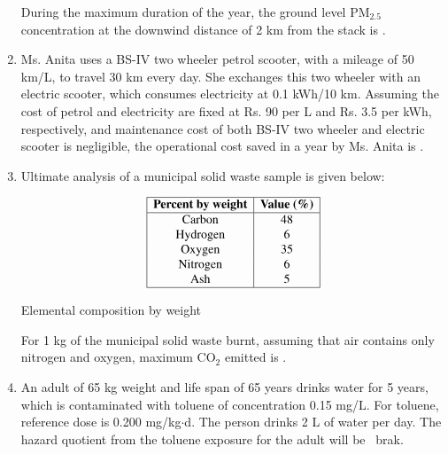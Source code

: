 \documentclass[journal,12pt,onecolumn]{IEEEtran}
\theoremstyle{remark}
\begin{document}
\begin{enumerate}
During the maximum duration of the year, the ground level PM$_{2.5}$ concentration at the downwind distance of 2 km  from the stack is \underline{\hspace{2cm}} .  
\hfill{}

\newpage

\item Ms. Anita uses a BS-IV two wheeler petrol scooter, with a mileage of 50 km/L, to travel 30 km every day. She exchanges this two wheeler with an electric scooter, which consumes electricity at 0.1 kWh/10 km. Assuming the cost of petrol and electricity are fixed at Rs. 90 per L and Rs. 3.5 per kWh, respectively, and maintenance cost of both BS-IV two wheeler and electric scooter is negligible, the operational cost saved in a year by Ms. Anita is \underline{\hspace{2cm}} .  
\hfill{}

\item Ultimate analysis of a municipal solid waste sample is given below:

\begin{table}[h!]
\centering
\[
\begin{array}{|c|c|}
\hline
\textbf{Percent by weight} & \textbf{Value (\%)} \\ \hline
\text{Carbon}    & 48 \\
\text{Hydrogen}  & 6  \\
\text{Oxygen}    & 35 \\
\text{Nitrogen}  & 6  \\
\text{Ash}       & 5  \\ \hline
\end{array}
\]
\caption{Elemental composition by weight}
\label{tab:composition}
\end{table}

For 1 kg of the municipal solid waste burnt, assuming that air contains only nitrogen and oxygen, maximum CO$_2$ emitted is \underline{\hspace{2cm}} .  
\hfill{}

\item An adult of 65 kg weight and life span of 65 years drinks water for 5 years, which is contaminated with toluene of concentration 0.15 mg/L. For toluene, reference dose is 0.200 mg/kg$\cdot$d. The person drinks 2 L of water per day. The hazard quotient from the toluene exposure for the adult will be \underline{\hspace{2cm}} \ brak{}.  
\hfill{}


\end{enumerate}
\end{document}
